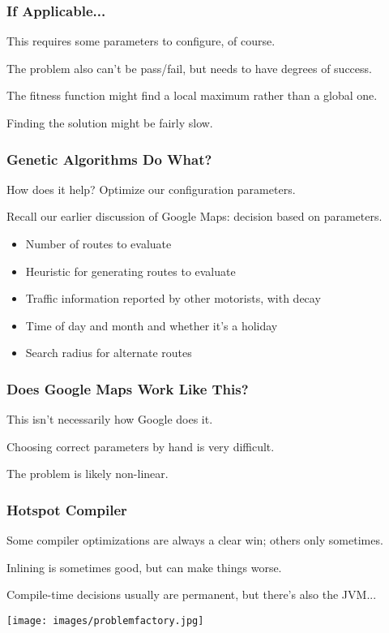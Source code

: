 \begin{frame}
\frametitle{If Applicable...}

This requires some parameters to configure, of course.

The problem also can't be pass/fail, but needs to have degrees of success.

The fitness function might find a local maximum rather than a global one.

Finding the solution might be fairly slow.

\end{frame}


\begin{frame}
\frametitle{Genetic Algorithms Do What?}

How does it help? Optimize our configuration parameters.

Recall our earlier discussion of Google Maps: decision based on parameters.

\begin{itemize}
	\item Number of routes to evaluate
	\item Heuristic for generating routes to evaluate
	\item Traffic information reported by other motorists, with decay
	\item Time of day and month and whether it's a holiday
	\item Search radius for alternate routes
\end{itemize}

\end{frame}


\begin{frame}
\frametitle{Does Google Maps Work Like This?}

This isn't necessarily how Google does it.

Choosing correct parameters by hand is very difficult.

The problem is likely non-linear.

\end{frame}


\begin{frame}
\frametitle{Hotspot Compiler}

Some compiler optimizations are always a clear win; others only sometimes.

Inlining is sometimes good, but can make things worse. 

Compile-time decisions usually are permanent, but there's also the JVM...

\begin{center}
	\texttt{[image: images/problemfactory.jpg]}
\end{center}

\end{frame}


